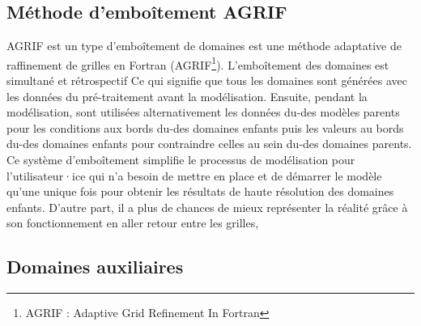 \documentclass[10pt,a4paper,titlepage]{article}
\begin{document}
    \subsection{Méthode d'emboîtement AGRIF}
    \label{anx:AGRIF}
    AGRIF est un type d'emboîtement de domaines est une méthode adaptative de raffinement de grilles en Fortran (AGRIF\footnote{AGRIF : Adaptive Grid Refinement In Fortran}).
    L'emboîtement des domaines est simultané et rétrospectif
    Ce qui signifie que tous les domaines sont générées avec les données du pré-traitement avant la modélisation.
    Ensuite, pendant la modélisation, sont utilisées alternativement les données du-des modèles parents pour les conditions aux bords du-des domaines enfants puis les valeurs au bords du-des domaines enfants pour contraindre celles au sein du-des domaines parents.
    Ce système d'emboîtement simplifie le processus de modélisation pour l'utilisateur·ice qui n'a besoin de mettre en place et de démarrer le modèle qu'une unique fois pour obtenir les résultats de haute résolution des domaines enfants.
    D'autre part, il a plus de chances de mieux représenter la réalité grâce à son fonctionnement en aller retour entre les grilles,
    
    \subsection{Domaines auxiliaires}
    
\end{document}
